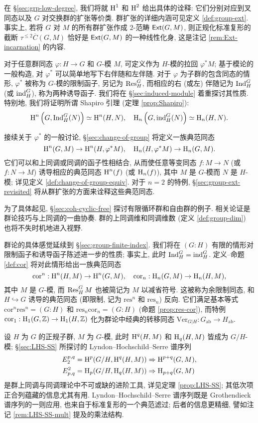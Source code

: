 在 \S\ref{sec:grp-low-degree}, 我们将就 $\operatorname{H}^1$ 和 $\operatorname{H}^2$ 给出具体的诠释: 它们分别对应到叉同态以及 $G$ 对交换群的扩张等价类. 群扩张的详细内涵可见定义 \ref{def:group-ext}. 事实上, 若将 $G$ 对 $M$ 的所有群扩张作成 $2$-范畴 $\mathsf{Ext}(G, M)$, 则正规化标准复形的截断 $\tau^{\leq 2} \overline{C}(G, M)$ 恰好是 $\mathsf{Ext}(G, M)$ 的一种线性化身, 这是注记 \ref{rem:Ext-incarnation} 的内容.

对于任意群同态 $\varphi: H \to G$ 和 $G$-模 $M$, 可定义作为 $H$-模的拉回 $\varphi^* M$; 基于模论的一般构造, 对 $\varphi^*$ 可以简单地写下右伴随和左伴随. 对于 $\varphi$ 为子群的包含同态的情形, $\varphi^*$ 被称为 $G$-模的限制函子, 另记为 $\operatorname{Res}^G_H$, 而相应的右 (或左) 伴随记为 $\operatorname{Ind}^G_H$ (或 $\operatorname{ind}^G_H$), 称为两种诱导函子. 我们将在 \S\ref{sec:induced-module} 着重探讨其性质. 特别地, 我们将证明所谓 Shapiro 引理 (定理 \ref{prop:Shapiro}):
\[ \operatorname{H}^n\left(G, \operatorname{Ind}^G_H(N)\right) \simeq \operatorname{H}^n(H, N), \quad \operatorname{H}_n\left(G, \operatorname{ind}^G_H(N)\right) \simeq \operatorname{H}_n(H, N). \]

接续关于 $\varphi^*$ 的一般讨论, \S\ref{sec:change-of-group} 将定义一族典范同态
\[ \operatorname{H}^n(G, M) \to \operatorname{H}^n(H, \varphi^* M), \quad \operatorname{H}_n(H, \varphi^* M) \to \operatorname{H}_n(G, M). \]
它们可以和上同调或同调的函子性相结合, 从而使任意等变同态 $f: M \to N$ (或 $f: N \to M$) 诱导相应的典范同态 $\operatorname{H}^n(f)$ (或 $\operatorname{H}_n(f)$), 其中 $M$ 是 $G$-模而 $N$ 是 $H$-模; 详见定义 \ref{def:change-of-group-equiv}. 对于 $n=2$ 的特例, \S\ref{sec:group-ext-revisited} 将从群扩张的方面来诠释这些典范同态.

为了具体起见, \S\ref{sec:coh-cyclic-free} 探讨有限循环群和自由群的例子. 相关论证是群论技巧与上同调的一曲协奏. 群的上同调维和同调维数 (定义 \ref{def:group-dim}) 也将不失时机地进入视野.

群论的具体感觉延续到 \S\ref{sec:group-finite-index}. 我们将在 $(G:H)$ 有限的情形对限制函子和诱导函子陈述进一步的性质; 事实上, 此时 $\operatorname{Ind}^G_H = \operatorname{ind}^G_H$. 定义--命题 \ref{def:cor} 将对此情形给出一族典范同态
\[ \mathrm{cor}^n: \operatorname{H}^n(H, M) \to \operatorname{H}^n(G, M), \quad \mathrm{cor}_n: \operatorname{H}_n(G, M) \to \operatorname{H}_n(H, M), \]
其中 $M$ 是 $G$-模, 而 $\operatorname{Res}^G_H M$ 也被简记为 $M$ 以减省符号. 这被称为余限制同态, 和 $H \hookrightarrow G$ 诱导的典范同态 (即限制, 记为 $\mathrm{res}^n$ 和 $\mathrm{res}_n$) 反向. 它们满足基本等式 $\mathrm{cor}^n \mathrm{res}^n = (G:H)$ 和 $\mathrm{res}_n \mathrm{cor}_n = (G:H)$ (命题 \ref{prop:res-cor}), 而特例 $\mathrm{cor}_1: \operatorname{H}_1(G, \mathbb{Z}) \to \operatorname{H}_1(H, \mathbb{Z})$ 化为群论中经典的转移同态 $\mathrm{Ver}_{G|H}: G_{\mathrm{ab}} \to H_{\mathrm{ab}}$.

设 $H$ 为 $G$ 的正规子群, $M$ 为 $G$-模, 此时 $\operatorname{H}^q(H, M)$ 和 $\operatorname{H}_q(H, M)$ 皆成为 $G/H$-模; \S\ref{sec:LHS-SS} 所探讨的 Lyndon--Hochschild--Serre 谱序列
\begin{align*}
	E_2^{p, q} = \operatorname{H}^p(G/H, \operatorname{H}^q(H, M)) & \Rightarrow \operatorname{H}^{p+q}(G, M), \\
	E^2_{p, q} = \operatorname{H}_p(G/H, \operatorname{H}_q(H, M)) & \Rightarrow \operatorname{H}_{p+q}(G, M)
\end{align*}
是群上同调与同调理论中不可或缺的进阶工具, 详见定理 \ref{prop:LHS-SS}; 其低次项正合列蕴藏的信息尤其有用. Lyndon--Hochschild--Serre 谱序列既是 Grothendieck 谱序列的一则应用, 也来自于标准复形的一个典范滤过; 后者的信息更精细, 譬如注记 \ref{rem:LHS-SS-mult} 提及的乘法结构.

